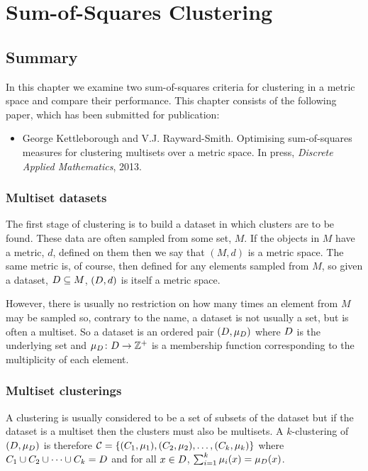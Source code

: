 \chapter{Sum-of-Squares Clustering}
\label{cha:sum-squar-clust}

\section{Summary}
\label{sec:summary-sum-squar}

In this chapter we examine two sum-of-squares criteria for clustering in a
metric space and compare their performance.  This chapter consists of the
following paper, which has been submitted for publication:

\begin{itemize}
\item George Kettleborough and V.J. Rayward-Smith. Optimising sum-of-squares
  measures for clustering multisets over a metric space. In press,
  \textit{Discrete Applied Mathematics}, 2013.
\end{itemize}

\subsection{Multiset datasets}
\label{sec:datasets}

The first stage of clustering is to build a dataset in which clusters are to
be found.  These data are often sampled from some set, $M$.  If the objects in
$M$ have a metric, $d$, defined on them then we say that $(M,d)$ is a metric
space.  The same metric is, of course, then defined for any elements sampled
from $M$, so given a dataset, $D \subseteq M$, $(D,d)$ is itself a
metric space.

However, there is usually no restriction on how many times an element from $M$
may be sampled so, contrary to the name, a dataset is not usually a set, but
is often a multiset.  So a dataset is an ordered pair $(D,\mu_{D})$
where $D$ is the underlying set and $\mu_{D} \colon D \to
\mathbb{Z}^+$ is a membership function corresponding to the multiplicity of
each element.

\subsection{Multiset clusterings}
\label{sec:multiset-clusterings}

A clustering is usually considered to be a set of subsets of the dataset but
if the dataset is a multiset then the clusters must also be multisets.  A
$k$-clustering of $(D,\mu_{D})$ is therefore $\mathcal{C} =
\{(C_{1},\mu_{1}),(C_{2},\mu_{2}),\dotsc,(C_{k},\mu_{k})\}$ where
$C_{1} \cup C_{2} \cup \dotsb \cup C_{k} = D$ and for all $x \in
D$, $\sum_{i=1}^{k} \mu_{i}(x) = \mu_{D}(x)$.

